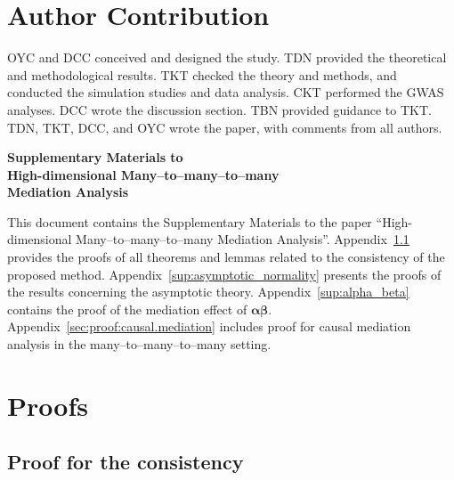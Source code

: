 \documentclass[
  12pt]{article}
\begin{document}
\section*{Author Contribution}

OYC and DCC conceived and designed the study. TDN provided the theoretical and methodological results. TKT checked the theory and methods, and conducted the simulation studies and data analysis. CKT performed the GWAS analyses. DCC wrote the discussion section. TBN provided guidance to TKT. TDN, TKT, DCC, and OYC wrote the paper, with comments from all authors.  


\clearpage
\appendix

\begin{center}
\textbf{\Large Supplementary Materials to}\\[3mm]
\textbf{\Large High-dimensional Many--to--many--to--many}\\
\textbf{\Large Mediation Analysis}
\end{center}

This document contains the Supplementary Materials to the paper ``High-dimensional Many--to--many--to--many Mediation Analysis''.
Appendix~\ref{sup:consistency} provides the proofs of all theorems and lemmas related to the consistency of the proposed method.
Appendix~\ref{sup:asymptotic_normality} presents the proofs of the results concerning the asymptotic theory. 
Appendix~\ref{sup:alpha_beta} contains the proof of the mediation effect of $\bm{\alpha}\bm{\beta}$. 
Appendix~\ref{sec:proof:causal.mediation} includes proof for causal mediation analysis in the many--to--many--to--many setting.

\section{Proofs}
\label{app. asymptotic theory}
\renewcommand{\theequation}{A\arabic{equation}}
\setcounter{equation}{0}
\subsection{Proof for the consistency}
\label{sup:consistency}
\end{document}
